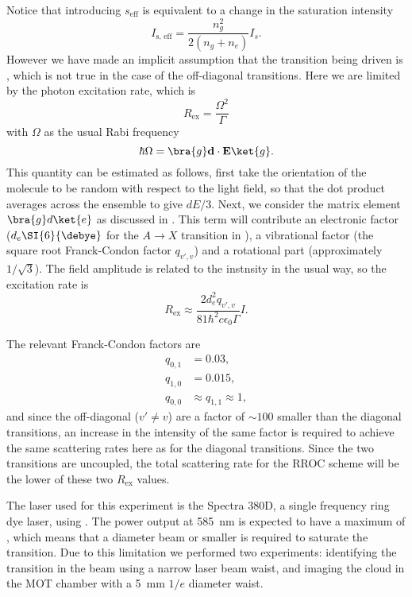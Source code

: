 Notice that introducing $s_\text{eff}$ is equivalent to a change in the
saturation intensity
%
\begin{equation}
  I_\text{s, eff} = \frac{n_g^2}{2(n_g + n_e)}I_s.
\end{equation}
%
However we have made an implicit assumption that the transition being driven is
, which is not true in the case of the
off-diagonal transitions. Here we are limited by the photon excitation rate,
which is
%
\begin{equation}
  R_\text{ex} = \frac{\Omega^2}{\Gamma}
\end{equation}
%
with $\Omega$ as the usual Rabi frequency
%
\begin{equation}
  \hbar \Omega = \bra{g}\mathbf{d}\cdot\mathbf{E}\ket{g}.
\end{equation}
%
%
This quantity can be estimated as follows, first take the orientation of the
molecule to be random with respect to the light field, so that the dot product
averages across the ensemble to give $dE/3$. Next, we consider the matrix
element $\bra{g}d\ket{e}$ as discussed in .
This term will contribute an electronic factor ($d_e\SI{6}{\debye}$
for the $A\rightarrow X$ transition in \CaF{}), a vibrational factor (the
square root Franck-Condon factor $q_{v',v}$) and a rotational part
(approximately $1/\sqrt{3}$). The field amplitude is related to the instnsity
in the usual way, so the excitation rate is
%
\begin{equation}
  R_\text{ex} \approx \frac{2 d_e^2 q_{v',v}}{81 \hbar^2 c \epsilon_0 \Gamma}I.
\end{equation}

The relevant Franck-Condon factors are
%
\begin{align}
  q_{0,1} &= 0.03,\\
  q_{1,0} &= 0.015,\\
  q_{0,0} &\approx q_{1,1} \approx 1,
\end{align}
%
and since the off-diagonal ($v' \neq v$) are a factor of $\sim100$ smaller than
the diagonal transitions, an increase in the intensity of the same factor is
required to achieve the same scattering rates here as for the diagonal
transitions. Since the two transitions are uncoupled, the total scattering rate
for the RROC scheme will be the lower of these two $R_\text{ex}$ values.

The  laser used for this experiment is the Spectra 380D, a single
frequency ring dye laser, using . The power output at
\SI{585}{\nano\meter} is expected to have a maximum of , which means
that a  diameter beam or smaller is required to saturate the transition.
Due to this limitation we performed two experiments: identifying the transition
in the \CaF{} beam using a narrow laser beam waist, and imaging the \CaF{}
cloud in the MOT chamber with a \SI{5}{\milli\meter} $1/e$ diameter waist.


